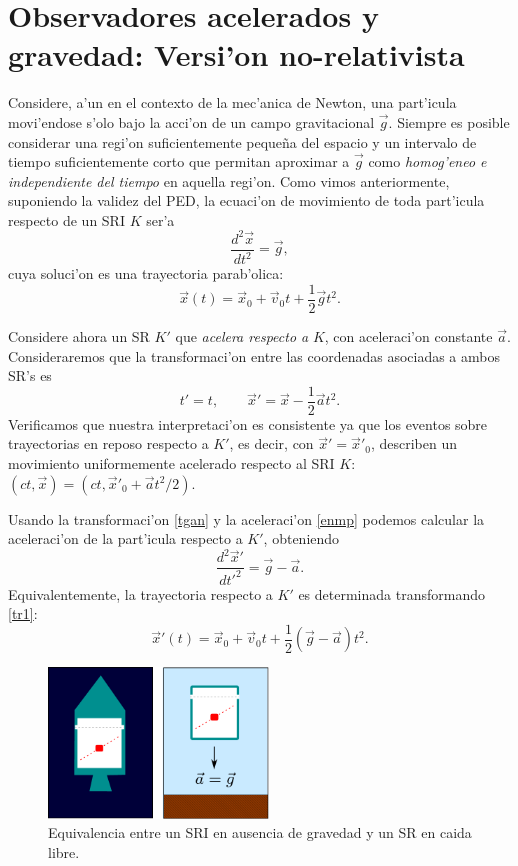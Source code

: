 \section{Observadores acelerados y gravedad: Versi'on no-rela\-ti\-vis\-ta}
Considere, a'un en el contexto de la mec'anica de Newton, una part'icula movi'endose s'olo bajo la acci'on de un campo gravitacional $\vec{g}$. Siempre es posible considerar una regi'on suficientemente peque\~na del espacio y un intervalo de tiempo suficientemente corto que permitan aproximar a $\vec{g}$ como \textit{homog'eneo e independiente del tiempo} en aquella regi'on. Como vimos anteriormente, suponiendo la validez del PED, la ecuaci'on de movimiento de toda part'icula respecto de un SRI $K$ ser'a
\begin{equation}\label{enmp}
\frac{d^2\vec{x}}{dt^2}=\vec{g},
\end{equation}
cuya soluci'on es una trayectoria parab'olica:
\begin{equation}\label{tr1}
\vec{x}(t)=\vec{x}_0+\vec{v}_0t+\frac{1}2\vec{g}t^2.
\end{equation}

Considere ahora un SR $K'$ que \textit{acelera respecto a} $K$, con aceleraci'on constante $\vec{a}$. Consideraremos que la transformaci'on entre las coordenadas asociadas a ambos SR's es 
\begin{equation}\label{tgan}
t'=t, \qquad \vec{x}'=\vec{x}-\frac{1}2\vec{a}t^2.
\end{equation}
Verificamos que nuestra interpretaci'on es consistente ya que los eventos sobre trayectorias en reposo respecto a $K'$, es decir, con $\vec{x}'=\vec{x}'_0$, describen un movimiento uniformemente acelerado respecto al SRI $K$: $(ct,\vec{x})=(ct,\vec{x}'_0+\vec{a}t^2/2)$.

Usando la transformaci'on \eqref{tgan} y la aceleraci'on \eqref{enmp} podemos calcular la aceleraci'on de la part'icula respecto a $K'$, obteniendo
\begin{equation}\label{acelprima}
\frac{d^2\vec{x}'}{dt'^2}=\vec{g}-\vec{a}.
\end{equation}
Equivalentemente, la trayectoria respecto a $K'$ es determinada transformando  \eqref{tr1}:
\begin{equation}
\vec{x}'(t)=\vec{x}_0+\vec{v}_0t+\frac{1}2(\vec{g}-\vec{a})t^2.
\end{equation}
\begin{center}
\begin{figure}[H]
\centerline{\includegraphics[height=4cm]{fig/fig-equivalencia.pdf}}
\caption{Equivalencia entre un SRI en ausencia de gravedad y un SR en caida libre.}
\label{fig:equiv2}
\end{figure}
\end{center}


